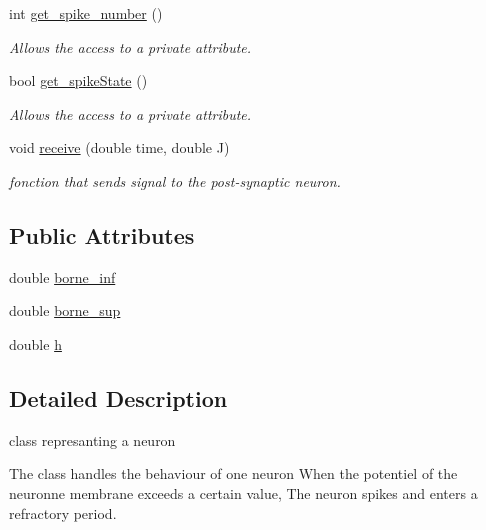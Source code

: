 \begin{DoxyCompactItemize}
int \hyperlink{classNeuron_a901a5dcb2cdf6b624d8b6b515b66ad7d}{get\-\_\-spike\-\_\-number} ()
\begin{DoxyCompactList}\small\item\em Allows the access to a private attribute. \end{DoxyCompactList}\item 
bool \hyperlink{classNeuron_a8bce8864e5fcd328585f01db61e93e71}{get\-\_\-spike\-State} ()
\begin{DoxyCompactList}\small\item\em Allows the access to a private attribute. \end{DoxyCompactList}\item 
void \hyperlink{classNeuron_ac29c1805fb20f82d8d660aa71984c8af}{receive} (double time, double J)
\begin{DoxyCompactList}\small\item\em fonction that sends signal to the post-\/synaptic neuron. \end{DoxyCompactList}\end{DoxyCompactItemize}
\subsection*{Public Attributes}
\begin{DoxyCompactItemize}
\item 
double \hyperlink{classNeuron_ae90ea57c6d9559c8adeb5c46ee6778e1}{borne\-\_\-inf}
\item 
double \hyperlink{classNeuron_af8db865bd7e1f841035fbd99c821dbed}{borne\-\_\-sup}
\item 
double \hyperlink{classNeuron_ae540cc540666b20457f914d7116eea24}{h}
\end{DoxyCompactItemize}


\subsection{Detailed Description}
class represanting a neuron 

The class handles the behaviour of one neuron When the potentiel of the neuronne membrane exceeds a certain value, The neuron spikes and enters a refractory period. 

